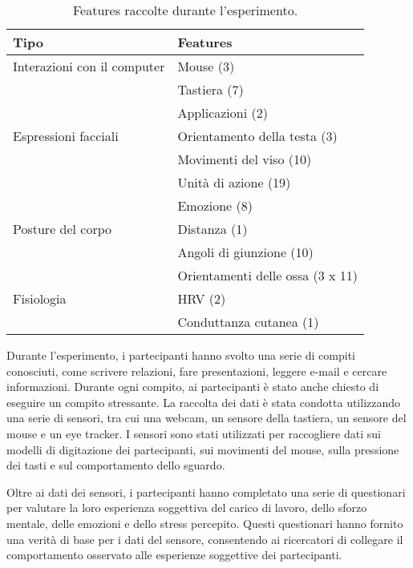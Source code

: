 \begin{table}[t]
    \centering
    \begin{tabular}{|ll|}
        \hline
        \textbf{Tipo}
        & \textbf{Features} \\
        \hline
        Interazioni con il computer
        & Mouse (3) \\ 
        & Tastiera (7) \\
        & Applicazioni (2) \\
        Espressioni facciali
        & Orientamento della testa (3) \\
        & Movimenti del viso (10) \\
        & Unità di azione (19) \\
        & Emozione (8) \\
        Posture del corpo
        & Distanza (1) \\
        & Angoli di giunzione (10) \\
        & Orientamenti delle ossa (3 x 11) \\
        Fisiologia
        & HRV (2) \\
        & Conduttanza cutanea (1) \\
        \hline
    \end{tabular}
    \caption{Features raccolte durante l'esperimento.}
    \label{tab:2-1}
\end{table}

Durante l'esperimento, i partecipanti hanno svolto una serie di compiti conosciuti, come scrivere relazioni, fare presentazioni, leggere e-mail e cercare informazioni. Durante ogni compito, ai partecipanti è stato anche chiesto di eseguire un compito stressante. La raccolta dei dati è stata condotta utilizzando una serie di sensori, tra cui una webcam, un sensore della tastiera, un sensore del mouse e un eye tracker. I sensori sono stati utilizzati per raccogliere dati sui modelli di digitazione dei partecipanti, sui movimenti del mouse, sulla pressione dei tasti e sul comportamento dello sguardo.

\bigskip

Oltre ai dati dei sensori, i partecipanti hanno completato una serie di questionari per valutare la loro esperienza soggettiva del carico di lavoro, dello sforzo mentale, delle emozioni e dello stress percepito. Questi questionari hanno fornito una verità di base per i dati del sensore, consentendo ai ricercatori di collegare il comportamento osservato alle esperienze soggettive dei partecipanti.

